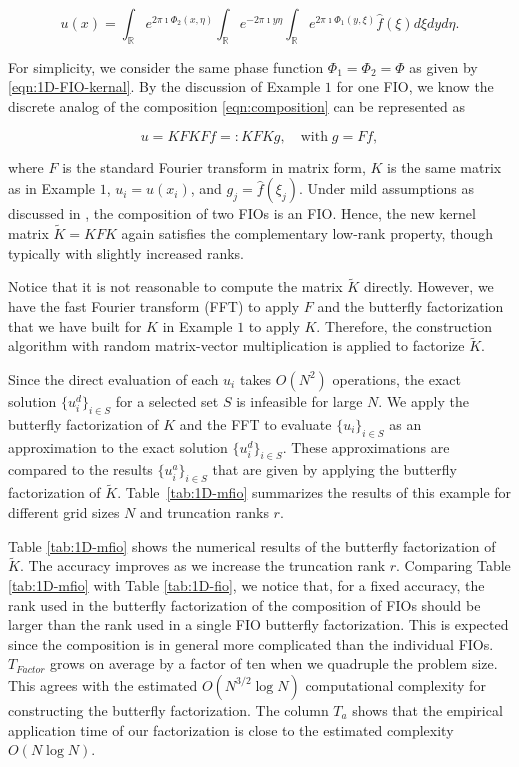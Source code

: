 \begin{equation}
  \label{eqn:composition}
  u(x) = \int_{\mathbb{R}}e^{2\pi \imath \Phi_2(x,\eta)}\int_{\mathbb{R}}
  e^{-2\pi \imath y\eta}\int_{\mathbb{R}}e^{2\pi \imath \Phi_1(y,\xi)}
  \widehat{f}(\xi)d\xi dy d\eta.
\end{equation}

For simplicity, we consider the same phase function
$\Phi_1=\Phi_2=\Phi$ as given by \eqref{eqn:1D-FIO-kernal}.  By the discussion of Example $1$ for one FIO, we know the discrete analog of the composition \eqref{eqn:composition} can be represented as

\begin{equation*}
  u=KFKF f =: KFK g,\quad \text{with}\; g=Ff,
\end{equation*}

where $F$ is the standard Fourier transform in matrix form, $K$ is the same matrix as in Example $1$, $u_i=u(x_i)$, and $g_j =
\widehat{f}(\xi_j)$.  Under mild assumptions as discussed in \cite{Theory}, the composition of two {FIOs} is an {FIO}.  Hence, the new kernel matrix $\tilde{K} = K F K$ again satisfies the complementary low-rank property, though typically with slightly increased ranks.

Notice that it is not reasonable to compute the matrix $\tilde{K}$
directly.  However, we have the fast Fourier transform (FFT) to apply $F$ and the butterfly factorization that we have built for $K$ in Example $1$ to apply $K$. Therefore, the construction algorithm with random matrix-vector multiplication is applied to factorize
$\tilde{K}$.

Since the direct evaluation of each $u_i$ takes $O(N^2)$ operations, the exact solution $\{u^d_i\}_{i\in S}$ for a selected set $S$ is infeasible for large $N$.  We apply the butterfly factorization of $K$ and the FFT to evaluate $\{u_i\}_{i\in S}$ as an approximation to the exact solution $\{u^d_i\}_{i\in S}$.  These approximations are compared to the results $\{u^a_i\}_{i\in S}$ that are given by applying the butterfly factorization of $\tilde{K}$.
Table~\ref{tab:1D-mfio}
summarizes the results of this example for different grid sizes $N$ and truncation ranks $r$.

Table \ref{tab:1D-mfio} shows the numerical results of the butterfly factorization of $\tilde{K}$.  The accuracy improves as we increase the truncation rank $r$.  Comparing Table \ref{tab:1D-mfio} with Table
\ref{tab:1D-fio}, we notice that, for a fixed accuracy, the rank used in the butterfly factorization of the composition of {FIOs} should be larger than the rank used in a single {FIO} butterfly factorization. This is expected since the composition is in general more complicated than the individual FIOs. $T_{Factor}$ grows on average by a factor of ten when we quadruple the problem size. This agrees with the estimated
$O(N^{3/2}\log N)$ computational complexity for constructing the butterfly factorization.  The column $T_a$ shows that the empirical application time of our factorization is close to the estimated complexity $O(N\log N)$.

